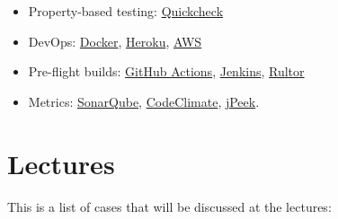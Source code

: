 \documentclass[nobrand,anonymous,nodate,nosecurity]{huawei}
\begin{document}
{\begin{itemize}
	\href{https://www.pitest.org}{PIT}
\item Property-based testing:
	\href{https://en.wikipedia.org/wiki/QuickCheck}{Quickcheck}
\item DevOps:
	\href{https://www.docker.com}{Docker},
	\href{https://www.heroku.com}{Heroku},
	\href{https://aws.amazon.com/}{AWS}
\item Pre-flight builds:
	\href{https://github.com/features/actions}{GitHub Actions},
	\href{https://www.jenkins.io}{Jenkins},
	\href{https://www.rultor.com}{Rultor}
\item Metrics:
	\href{https://www.sonarqube.org}{SonarQube},
	\href{https://codeclimate.com/}{CodeClimate},
	\href{https://www.jpeek.org}{jPeek}.
\end{itemize}

\newpage
\section*{Lectures}

\newcommand\github[1]{\href{https://github.com/#1}{#1}}

This is a list of cases that will be discussed at the lectures:

}
\end{document}
